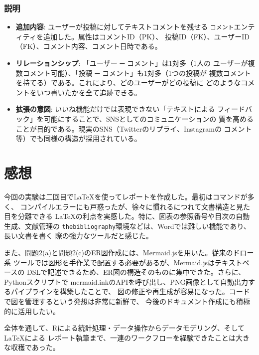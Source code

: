 \documentclass[12pt,a4paper]{ltjsarticle}
\begin{document}
\subsubsection{説明}
\begin{itemize}[nosep]
    \item \textbf{追加内容}: ユーザーが投稿に対してテキストコメントを残せる
          \texttt{コメント}エンティティを追加した。属性はコメントID（PK）、
          投稿ID（FK）、ユーザーID（FK）、コメント内容、コメント日時である。
    \item \textbf{リレーションシップ}: 「ユーザー ─ コメント」は1対多（1人の
          ユーザーが複数コメント可能）、「投稿 ─ コメント」も1対多（1つの投稿が
          複数コメントを持てる）である。これにより、どのユーザーがどの投稿に
          どのようなコメントをいつ書いたかを全て追跡できる。
    \item \textbf{拡張の意図}: いいね機能だけでは表現できない「テキストによる
          フィードバック」を可能にすることで、SNSとしてのコミュニケーションの
          質を高めることが目的である。現実のSNS（Twitterのリプライ、Instagramの
          コメント等）でも同様の構造が採用されている。
\end{itemize}

\clearpage

\section{感想}\label{sec:impression}

今回の実験は二回目で\LaTeX を使ってレポートを作成した。最初はコマンドが多く、
コンパイルエラーにも戸惑ったが、徐々に慣れるにつれて文書構造と見た目を分離できる
\LaTeX の利点を実感した。特に、図表の参照番号や目次の自動生成、文献管理の
\texttt{thebibliography}環境などは、Wordでは難しい機能であり、長い文書を書く
際の強力なツールだと感じた。

また、問題2(a)と問題2(c)のER図作成には、Mermaid.jsを用いた。従来のドロー系
ツールでは図形を手作業で配置する必要があるが、Mermaid.jsはテキストベースの
DSLで記述できるため、ER図の構造そのものに集中できた。さらに、Pythonスクリプトで
mermaid.inkのAPIを呼び出し、PNG画像として自動出力するパイプラインを構築したことで、
図の修正や再生成が容易になった。コードで図を管理するという発想は非常に新鮮で、
今後のドキュメント作成にも積極的に活用したい。

全体を通して、Rによる統計処理・データ操作からデータモデリング、そして\LaTeX による
レポート執筆まで、一連のワークフローを経験できたことは大きな収穫であった。
\end{document}
